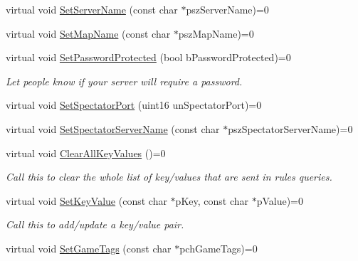 \begin{DoxyCompactItemize}
virtual void \hyperlink{class_i_steam_game_server_ab5f99b45fcc464d230d7cebad1ab149c}{Set\+Server\+Name} (const char $\ast$psz\+Server\+Name)=0
\item 
virtual void \hyperlink{class_i_steam_game_server_a990b3a4d52dfd3353252bb3590274016}{Set\+Map\+Name} (const char $\ast$psz\+Map\+Name)=0
\item 
\mbox{\label{class_i_steam_game_server_ae518b4d7875d0867431573715f03e071}} 
virtual void \hyperlink{class_i_steam_game_server_ae518b4d7875d0867431573715f03e071}{Set\+Password\+Protected} (bool b\+Password\+Protected)=0
\begin{DoxyCompactList}\small\item\em Let people know if your server will require a password. \end{DoxyCompactList}\item 
virtual void \hyperlink{class_i_steam_game_server_a7057995594c62bb0c20d7c52c684380e}{Set\+Spectator\+Port} (uint16 un\+Spectator\+Port)=0
\item 
virtual void \hyperlink{class_i_steam_game_server_a076fbd010db81fc49b64db24d83d02d7}{Set\+Spectator\+Server\+Name} (const char $\ast$psz\+Spectator\+Server\+Name)=0
\item 
\mbox{\label{class_i_steam_game_server_a74225bfdc7f75e29de3db649334fde7c}} 
virtual void \hyperlink{class_i_steam_game_server_a74225bfdc7f75e29de3db649334fde7c}{Clear\+All\+Key\+Values} ()=0
\begin{DoxyCompactList}\small\item\em Call this to clear the whole list of key/values that are sent in rules queries. \end{DoxyCompactList}\item 
\mbox{\label{class_i_steam_game_server_a69a8b52ed6637094322c3479c335c94a}} 
virtual void \hyperlink{class_i_steam_game_server_a69a8b52ed6637094322c3479c335c94a}{Set\+Key\+Value} (const char $\ast$p\+Key, const char $\ast$p\+Value)=0
\begin{DoxyCompactList}\small\item\em Call this to add/update a key/value pair. \end{DoxyCompactList}\item 
virtual void \hyperlink{class_i_steam_game_server_a2e12f2c66ae3f42bdc23a6e2a3f65697}{Set\+Game\+Tags} (const char $\ast$pch\+Game\+Tags)=0

\end{DoxyCompactItemize}
